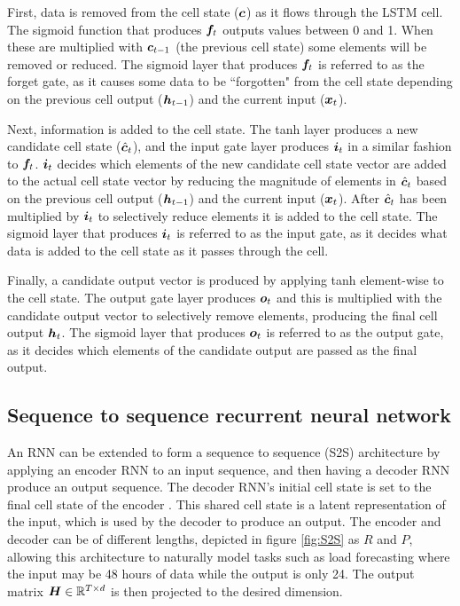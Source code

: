 First, data is removed from the cell state (${\bm{c}}$) as it flows through the LSTM cell.
The sigmoid function that produces ${\bm{f}}_t$ outputs values between 0 and 1.
When these are multiplied with ${\bm{c}}_{t-1}$ (the previous cell state) some elements will be removed or reduced.
The sigmoid layer that produces ${\bm{f}}_t$ is referred to as the forget gate, as it causes some data to be ``forgotten" from the cell state depending on the previous cell output (${\bm{h}}_{t-1}$) and the current input (${\bm{x}}_t$).

Next, information is added to the cell state.
The tanh layer produces a new candidate cell state ($\hat{{\bm{c}}}_t$), and the input gate layer produces ${\bm{i}}_t$ in a similar fashion to ${\bm{f}}_t$.
${\bm{i}}_t$ decides which elements of the new candidate cell state vector are added to the actual cell state vector by reducing the magnitude of elements in $\hat{{\bm{c}}}_t$ based on the previous cell output (${\bm{h}}_{t-1}$) and the current input (${\bm{x}}_t$).
After $\hat{{\bm{c}}}_t$ has been multiplied by ${\bm{i}}_t$ to selectively reduce elements it is added to the cell state.
The sigmoid layer that produces ${\bm{i}}_t$ is referred to as the input gate, as it decides what data is added to the cell state as it passes through the cell.

Finally, a candidate output vector is produced by applying tanh element-wise to the cell state.
The output gate layer produces ${\bm{o}}_t$ and this is multiplied with the candidate output vector to selectively remove elements, producing the final cell output ${\bm{h}}_t$.
The sigmoid layer that produces ${\bm{o}}_t$ is referred to as the output gate, as it decides which elements of the candidate output are passed as the final output.

\subsection{Sequence to sequence recurrent neural network}
\label{section-S2S}
An RNN can be extended to form a sequence to sequence (S2S) architecture by applying an encoder RNN to an input sequence, and then having a decoder RNN produce an output sequence.
The decoder RNN's initial cell state is set to the final cell state of the encoder \cite{Cho2014a}.
This shared cell state is a latent representation of the input, which is used by the decoder to produce an output.
The encoder and decoder can be of different lengths, depicted in figure \ref{fig:S2S} as $R$ and $P$, allowing this architecture to naturally model tasks such as load forecasting where the input may be 48 hours of data while the output is only 24.
The output matrix ${\bm{H}} \in \mathbb{R}^{T \times d}$ is then projected to the desired dimension.

